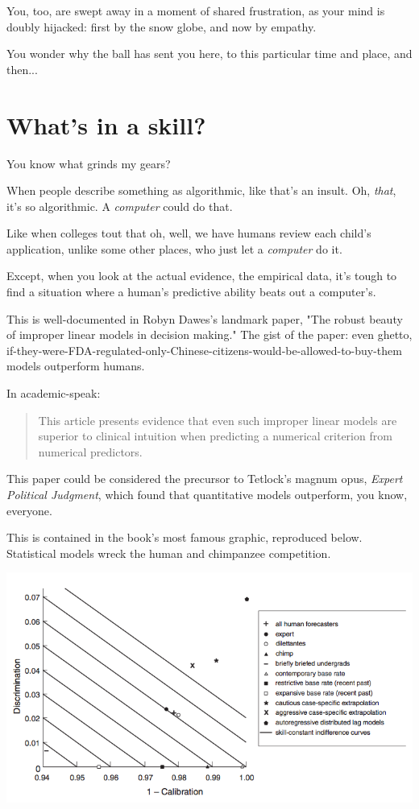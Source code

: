 You, too, are swept away in a moment of shared frustration, as your mind is
doubly hijacked: first by the snow globe, and now by empathy.

You wonder why the ball has sent you here, to this particular time and place,
and then...

\section{What's in a skill? }

You know what grinds my gears?

When people describe something as algorithmic, like that's an
insult. Oh, \textit{that}, it's so algorithmic. A \textit{computer} could do that.

Like when colleges tout that oh, well, we have humans review each child's
application, unlike some other places, who just let a \textit{computer} do
it.

Except, when you look at the actual evidence, the empirical data, it's tough to find a
situation where a human's predictive ability beats out a computer's.

This is well-documented in Robyn Dawes's landmark paper, "The robust beauty of
improper linear models in decision making." The gist of the paper: even ghetto,
if-they-were-FDA-regulated-only-Chinese-citizens-would-be-allowed-to-buy-them
models outperform humans.

In academic-speak:

\begin{quote}
This article presents evidence that even such improper linear models are
superior to clinical intuition when predicting a numerical criterion from
numerical predictors. 
\end{quote}

This paper could be considered the precursor to Tetlock's magnum opus, \textit{Expert
Political Judgment}, which found that quantitative models outperform, you know,
everyone.

This is contained in the book's most famous graphic, reproduced
below. Statistical models wreck the human and chimpanzee competition.

\includegraphics[width=\textwidth]{graphics/expert-political-judgment}

